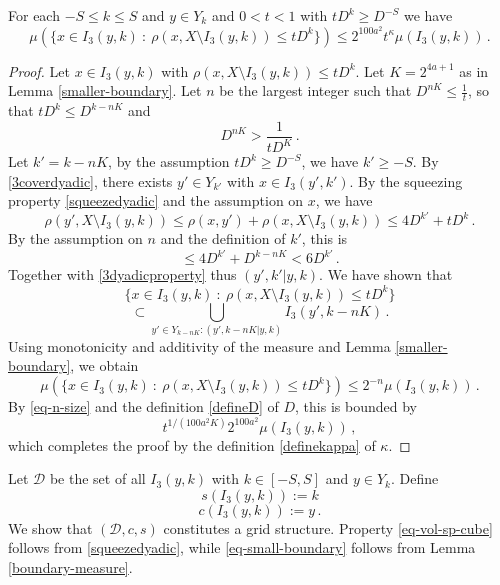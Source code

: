 \begin{lemma}
\label{boundary-measure}
 For each $-S\le k\le S$ and $y\in Y_k$ and $0<t<1$
 with $tD^k\ge D^{-S}$ we have
    \begin{equation}
        \label{old-small-boundary}
        \mu(\{x \in I_3(y,k) \ : \ \rho(x, X \setminus I_3(y,k)) \leq t D^{k}\}) \le 2^{100a^2} t^\kappa \mu(I_3(y,k))\,.
    \end{equation}
\end{lemma}
\begin{proof}
Let $x\in I_3(y,k)$ with  $\rho(x, X \setminus I_3(y,k)) \leq t D^{k}$. Let $K = 2^{4a+1}$ as in Lemma \ref{smaller-boundary}.
Let $n$ be the largest integer such that
$D^{nK} \le \frac{1}{t}$, so that $tD^k \le D^{k-nK}$ and
\begin{equation}
\label{eq-n-size}
    D^{nK} > \frac{1}{tD^K}\,.
\end{equation}
Let $k' = k - nK$, by the assumption $tD^k \ge D^{-S}$, we have $k' \ge -S$. By \eqref{3coverdyadic}, there exists $y' \in Y_{k'}$ with $x \in I_3(y',k')$. By the squeezing property \eqref{squeezedyadic} and the assumption on $x$, we have
$$
    \rho(y', X \setminus I_3(y,k)) \le \rho(x,y') + \rho(x, X \setminus I_3(y,k)) \le 4 D^{k'} + t D^{k}\,.
$$
By the assumption on $n$ and the definition of $k'$, this is
$$
    \le 4D^{k'} + D^{k - nK} < 6D^{k'}\,.
$$
Together with \eqref{3dyadicproperty} thus $(y',k'|y,k)$. We have shown that
$$
    \{x \in I_3(y,k) \ : \ \rho(x, X \setminus I_3(y,k)) \leq t D^{k}\}
$$
$$
    \subset \bigcup_{y'\in Y_{k-nK}: (y',k-nK|y,k)}I_3(y',k-nK)\,.
$$
Using monotonicity and additivity of the measure and Lemma \ref{smaller-boundary}, we obtain
$$
    \mu(\{x \in I_3(y,k) \ : \ \rho(x, X \setminus I_3(y,k)) \leq t D^{k}\}) \le 2^{-n} \mu(I_3(y,k))\,.
$$
By \eqref{eq-n-size} and the definition \eqref{defineD} of $D$, this is bounded by
$$
    t^{1/(100a^2 K)} 2^{100a^2} \mu(I_3(y,k))\,,
$$
which completes the proof by the definition \eqref{definekappa} of $\kappa$.
\end{proof}

Let $\mathcal{D}$ be the set of all $I_3(y,k)$ with $k\in [-S,S]$ and
$y\in Y_k$. Define
\begin{equation}
s(I_3(y,k)):=k
\end{equation}
\begin{equation}
c(I_3(y,k)):=y\,.
\end{equation}
We show that $(\mathcal{D},c,s)$ constitutes a grid structure. Property \eqref{eq-vol-sp-cube}
follows from \eqref{squeezedyadic}, while \eqref{eq-small-boundary} follows from Lemma \ref{boundary-measure}.


